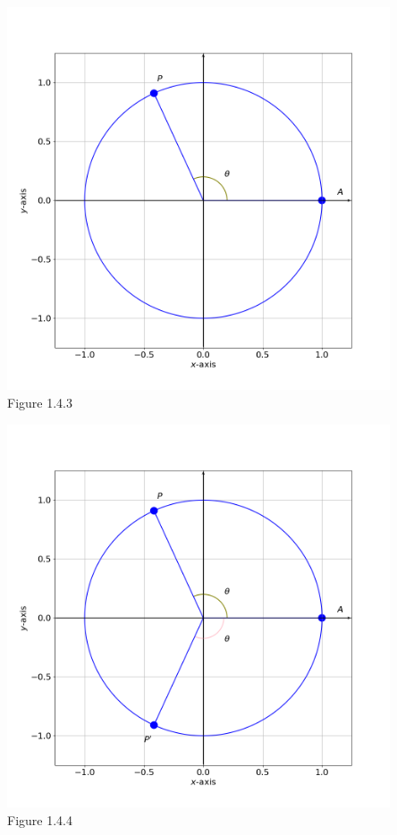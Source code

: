 \documentclass[11pt]{book}
\theoremstyle{break}
\theoremstyle{no_label}
\newcommand{\figtag}[1]{\\[-1.2em]Figure {#1}}
\numberwithin{equation}{section}
\begin{document}
\begin{center}
    \begin{minipage}{0.48\textwidth}
        \begin{center}
            \includegraphics[width=0.85\textwidth]{unit_circle_1.png}\figtag{1.4.3}
        \end{center}
    \end{minipage}
    \begin{minipage}{0.48\textwidth}
        \begin{center}
            \includegraphics[width=0.85\textwidth]{unit_circle_2.png}\figtag{1.4.4}
        \end{center}
    \end{minipage}
\end{center}
\end{document}
